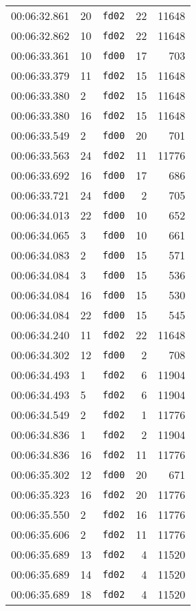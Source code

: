 \documentclass{article}
\begin{document}
\begin{longtable}{lllrr}
00:06:32.861 & 20 & \texttt{fd02} & 22 & 11648 \\
00:06:32.862 & 10 & \texttt{fd02} & 22 & 11648 \\
00:06:33.361 & 10 & \texttt{fd00} & 17 & 703 \\
00:06:33.379 & 11 & \texttt{fd02} & 15 & 11648 \\
00:06:33.380 & 2 & \texttt{fd02} & 15 & 11648 \\
00:06:33.380 & 16 & \texttt{fd02} & 15 & 11648 \\
00:06:33.549 & 2 & \texttt{fd00} & 20 & 701 \\
00:06:33.563 & 24 & \texttt{fd02} & 11 & 11776 \\
00:06:33.692 & 16 & \texttt{fd00} & 17 & 686 \\
00:06:33.721 & 24 & \texttt{fd00} & 2 & 705 \\
00:06:34.013 & 22 & \texttt{fd00} & 10 & 652 \\
00:06:34.065 & 3 & \texttt{fd00} & 10 & 661 \\
00:06:34.083 & 2 & \texttt{fd00} & 15 & 571 \\
00:06:34.084 & 3 & \texttt{fd00} & 15 & 536 \\
00:06:34.084 & 16 & \texttt{fd00} & 15 & 530 \\
00:06:34.084 & 22 & \texttt{fd00} & 15 & 545 \\
00:06:34.240 & 11 & \texttt{fd02} & 22 & 11648 \\
00:06:34.302 & 12 & \texttt{fd00} & 2 & 708 \\
00:06:34.493 & 1 & \texttt{fd02} & 6 & 11904 \\
00:06:34.493 & 5 & \texttt{fd02} & 6 & 11904 \\
00:06:34.549 & 2 & \texttt{fd02} & 1 & 11776 \\
00:06:34.836 & 1 & \texttt{fd02} & 2 & 11904 \\
00:06:34.836 & 16 & \texttt{fd02} & 11 & 11776 \\
00:06:35.302 & 12 & \texttt{fd00} & 20 & 671 \\
00:06:35.323 & 16 & \texttt{fd02} & 20 & 11776 \\
00:06:35.550 & 2 & \texttt{fd02} & 16 & 11776 \\
00:06:35.606 & 2 & \texttt{fd02} & 11 & 11776 \\
00:06:35.689 & 13 & \texttt{fd02} & 4 & 11520 \\
00:06:35.689 & 14 & \texttt{fd02} & 4 & 11520 \\
00:06:35.689 & 18 & \texttt{fd02} & 4 & 11520 \\

\end{longtable}
\end{document}
